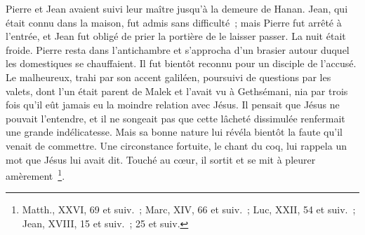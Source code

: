 \documentclass[french,twoside]{book} %
\begin{document}
Pierre et Jean avaient suivi leur maître jusqu’à la demeure de Hanan. Jean, qui était connu dans la maison, fut admis sans difficulté ; mais Pierre fut arrêté à l’entrée, et Jean fut obligé de prier la portière de le laisser passer. La nuit était froide. Pierre resta dans l’antichambre et s’approcha d’un brasier autour duquel les domestiques se chauffaient. Il fut bientôt reconnu pour un disciple de l’accusé. Le malheureux, trahi par son accent galiléen, poursuivi de questions par les valets, dont l’un était parent de Malek et l’avait vu à Gethsémani, nia par trois fois qu’il eût jamais eu la moindre relation avec Jésus. Il pensait que Jésus ne pouvait l’entendre, et il ne songeait pas que cette lâcheté dissimulée renfermait une grande indélicatesse. Mais sa bonne nature lui révéla bientôt la faute qu’il venait de commettre. Une circonstance fortuite, le chant du coq, lui rappela un mot que Jésus lui avait dit. Touché au cœur, il sortit et se mit à pleurer amèrement \footnote{Matth., XXVI, 69 et suiv. ; Marc, XIV, 66 et suiv. ; Luc, XXII, 54 et suiv. ; Jean, XVIII, 15 et suiv. ; 25 et suiv.}.\par
\end{document}
